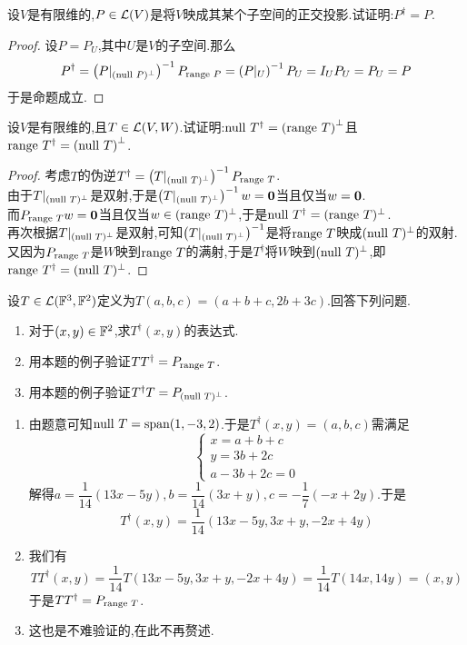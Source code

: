\documentclass{ctexart}
\begin{document}
\begin{problem}[19.]
    设$V$是有限维的,$P\in\mathcal{L}(V)$是将$V$映成其某个子空间的正交投影.试证明:$P^\dagger=P$.
\end{problem}
\begin{proof}
    设$P=P_U$,其中$U$是$V$的子空间.那么
    \[P^\dagger=\left(P|_{(\text{null } P)^\bot}\right)^{-1}P_{\text{range } P}=\left(P|_U\right)^{-1}P_U=I_UP_U=P_U=P\]
    于是命题成立.
\end{proof}
\begin{problem}[20.]
    设$V$是有限维的,且$T\in\mathcal{L}(V,W)$.试证明:$\text{null } T^\dagger=\left(\text{range } T\right)^\bot$且$\text{range } T^\dagger=\left(\text{null } T\right)^\bot$.
\end{problem}
\begin{proof}
    考虑$T$的伪逆$T^\dagger=\left(T|_{(\text{null } T)^\bot}\right)^{-1}P_{\text{range } T}$.\\
    由于$T|_{(\text{null } T)^\bot}$是双射,于是$\left(T|_{(\text{null } T)^\bot}\right)^{-1}w=\mathbf0$当且仅当$w=\mathbf0$.\\
    而$P_{\text{range } T}w=\mathbf0$当且仅当$w\in(\text{range } T)^\bot$,于是$\text{null } T^\dagger=(\text{range } T)^\bot$.\\
    再次根据$T|_{(\text{null } T)^\bot}$是双射,可知$\left(T|_{(\text{null } T)^\bot}\right)^{-1}$是将$\text{range } T$映成$(\text{null } T)^\bot$的双射.\\
    又因为$P_{\text{range } T}$是$W$映到$\text{range } T$的满射,于是$T^\dagger$将$W$映到$(\text{null } T)^\bot$,即$\text{range } T^{\dagger}=(\text{null } T)^{\bot}$.
\end{proof}
\begin{problem}[21.]
    设$T\in\mathcal{L}(\mathbb{F}^3,\mathbb{F}^2)$定义为$T(a,b,c)=(a+b+c,2b+3c)$.回答下列问题.
    \begin{enumerate}[label=\tbf{(\arabic*)}]
        \item 对于$(x,y)\in\mathbb{F}^2$,求$T^\dagger(x,y)$的表达式.
        \item 用本题的例子验证$TT^\dagger=P_{\text{range } T}$.
        \item 用本题的例子验证$T^\dagger T=P_{(\text{null } T)^\bot}$.
    \end{enumerate}
\end{problem}
\begin{solution}
    \begin{enumerate}[label=\tbf{(\arabic*)}]
        \item 由题意可知$\text{null } T=\text{span}(1,-3,2)$.于是$T^\dagger(x,y)=(a,b,c)$需满足
            \[\left\{\begin{array}{l}
                x=a+b+c\\
                y=3b+2c\\
                a-3b+2c=0
            \end{array}\right.\]
            解得$a=\dfrac{1}{14}(13x-5y),b=\dfrac{1}{14}(3x+y),c=-\dfrac17(-x+2y)$.于是
            \[T^\dagger(x,y)=\dfrac{1}{14}(13x-5y,3x+y,-2x+4y)\]
        \item 我们有
            \[TT^{\dagger}(x,y)=\dfrac{1}{14}T(13x-5y,3x+y,-2x+4y)=\dfrac{1}{14}T(14x,14y)=(x,y)\]
            于是$TT^\dagger=P_{\text{range } T}$.
        \item 这也是不难验证的,在此不再赘述.
    \end{enumerate}
\end{solution}
\end{document}
